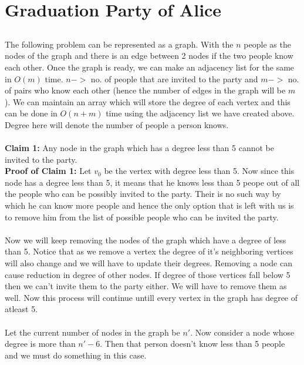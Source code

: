\documentclass{article}
\begin{document}
\section{Graduation Party of Alice}

\subsection{}
The following problem can be represented as a graph. With the $n$ people as the nodes of the graph and there is an edge between 2 nodes if the two people know each other. Once the graph is ready, we can make an adjacency list for the same in $O(m)$ time. $n->$ no. of people that are invited to the party and $m->$ no. of pairs who know each other (hence the number of edges in the graph will be $m$). We can maintain an array which will store the degree of each vertex and this can be done in $O(n+m)$ time using the adjacency list we have created above. Degree here will denote the number of people a person knows.
\\\\
\textbf{Claim 1:} Any node in the graph which has a degree less than 5 cannot be invited to the party.\\
\textbf{Proof of Claim 1:} Let $v_0$ be the vertex with degree less than 5. Now since this node has a degree less than 5, it means that he knows less than 5 peope out of all the people who can be possibly invited to the party. Their is no such way by which he can know more people and hence the only option that is left with us is to remove him from the list of possible people who can be invited the party.
\\\\
Now we will keep removing the nodes of the graph which have a degree of less than 5. Notice that as we remove a vertex the degree of it's neighboring vertices will also change and we will have to update their degrees. Removing a node can cause reduction in degree of other nodes. If degree of those vertices fall below 5 then we can't invite them to the party either. We will have to remove them as well. Now this process will continue untill every vertex in the graph has degree of atleast 5.
\\\\
Let the current number of nodes in the graph be $n'$. Now consider a node whose degree is more than $n'-6$. Then that person doesn't know less than 5 people and we must do something in this case. 
\\\\
\end{document}
